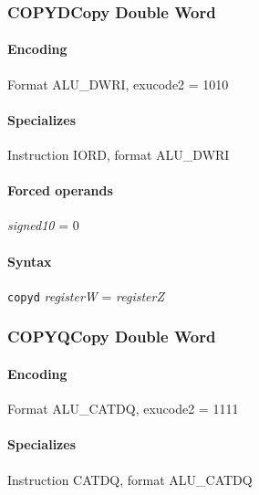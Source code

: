 \subsubsectionfont{\color{kalrayblue}}
{
\subsubsection[{\small COPYD: Copy Double Word}]{COPYD\hfill Copy Double Word}
\label{instr:COPYD}

\paragraph{Encoding} Format \textsf{ALU\_DWRI, exucode2 = 1010}\\



\paragraph{Specializes} Instruction IORD, format ALU\_DWRI

\paragraph{Forced operands} \emph{signed10} = 0

\paragraph{Syntax} \texttt{copyd} \emph{registerW} = \emph{registerZ}
\newpage
\subsubsection[{\small COPYQ: Copy Double Word}]{COPYQ\hfill Copy Double Word}
\label{instr:COPYQ}

\paragraph{Encoding} Format \textsf{ALU\_CATDQ, exucode2 = 1111}\\



\paragraph{Specializes} Instruction CATDQ, format ALU\_CATDQ

}
